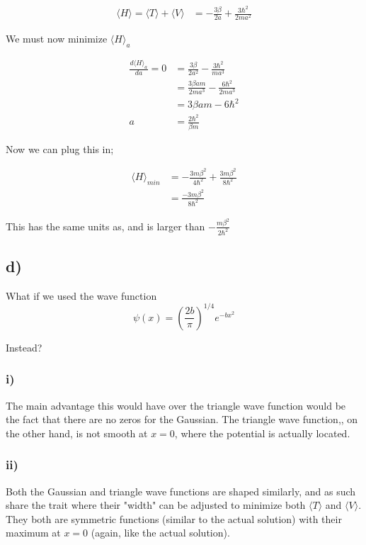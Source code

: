 \documentclass{article}
\newcommand{\p}[1]{\left(#1\right)}
\newcommand{\braket}[1]{\langle#1\rangle}
\begin{document}
\begin{align*}
    \braket{H}=\braket{T}+\braket{V}&=-\frac{3\beta}{2a}+\frac{3\hbar^2}{2ma^2}
\end{align*}

We must now minimize $\braket{H}_a$

\begin{align*}
    \frac{d\braket{H}_a}{da}=0&=\frac{3\beta}{2a^2}-\frac{3\hbar^2}{ma^3}\\[1em]
    &=\frac{3\beta{a}{m}}{2ma^3}-\frac{6\hbar^2}{2ma^3}\\[1em]
    &=3\beta{a}m-6\hbar^2\\[1em]
    a&=\frac{2\hbar^2}{\beta{m}}
\end{align*}

Now we can plug this in;

\begin{align*}
    \braket{H}_{min}&=-\frac{3m\beta^2}{4\hbar^2}+\frac{3m\beta^2}{8\hbar^2}\\[1em]
    &=\frac{-3m\beta^2}{8\hbar^2}
\end{align*}

This has the same units as, and is larger than $-\frac{m\beta^2}{2\hbar^2}$

\subsection*{d)}
What if we used the wave function $$\psi(x)=\p{\frac{2b}{\pi}}^{1/4}e^{-bx^2}$$

Instead?
\subsubsection*{i)}
The main advantage this would have over the triangle wave function would be the fact that there are no zeros for the Gaussian. The triangle wave function,, on the other hand, is not smooth at $x=0$, where the potential is actually located.

\subsubsection*{ii)}
Both the Gaussian and triangle wave functions are shaped similarly, and as such share the trait where their "width" can be adjusted to minimize both $\braket{T}$ and $\braket{V}$. They both are symmetric functions (similar to the actual solution) with their maximum at $x=0$ (again, like the actual solution).
\end{document}
